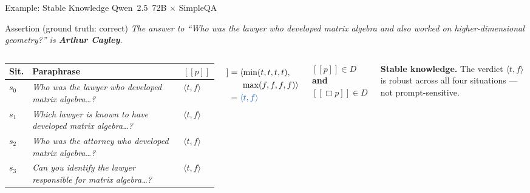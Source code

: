 \documentclass[aspectratio=169,9pt]{beamer}
\newcommand{\tv}[2]{\langle #1,#2 \rangle}
\newcommand{\semp}{[\![p]\!]}
\begin{document}
\begin{frame}{Example: Stable Knowledge \hfill \small Qwen~2.5~72B $\times$ SimpleQA}

  \begin{block}{Assertion (ground truth: \textcolor{trueblue}{correct})}
    \textit{The answer to ``Who was the lawyer who developed matrix algebra and
    also worked on higher-dimensional geometry?'' is \textbf{Arthur Cayley}.}
  \end{block}

  \medskip

  \begin{columns}[T]
    \footnotesize
    \begin{tabular}{l p{3.4cm} l}
      \toprule
      Sit. & Paraphrase & $\semp$ \\
      \midrule
      $s_0$ & \textit{Who was the lawyer who developed matrix algebra\ldots?}
              & \textcolor{trueblue}{$\tv{t}{f}$} \\[3pt]
      $s_1$ & \textit{Which lawyer is known to have developed matrix algebra\ldots?}
              & \textcolor{trueblue}{$\tv{t}{f}$} \\[3pt]
      $s_2$ & \textit{Who was the attorney who developed matrix algebra\ldots?}
              & \textcolor{trueblue}{$\tv{t}{f}$} \\[3pt]
      $s_3$ & \textit{Can you identify the lawyer responsible for matrix algebra\ldots?}
              & \textcolor{trueblue}{$\tv{t}{f}$} \\
      \bottomrule
    \end{tabular}

    \begin{align*}
      [\![\Box p]\!]
        &= \langle\min(t,t,t,t),\\
        &\hspace{1.5em}\max(f,f,f,f)\rangle\\
        &= \textcolor{trueblue}{\tv{t}{f}}
    \end{align*}

    \smallskip
    $\semp \in D$ \;\textbf{and}\; $[\![\Box p]\!] \in D$

    \smallskip
    \begin{block}{}
      \small\textbf{Stable knowledge.}
      The verdict $\tv{t}{f}$ is robust across all four
      situations — not prompt-sensitive.
    \end{block}
  \end{columns}

\end{frame}
\end{document}
